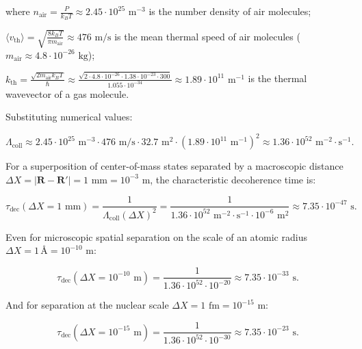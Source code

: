 where $n_{\text{air}} = \frac{P}{k_B T} \approx 2.45 \cdot 10^{25}\text{ m}^{-3}$ is the number density of air molecules;  

$\langle v_{\text{th}} \rangle = \sqrt{\frac{8 k_B T}{\pi m_{\text{air}}}} \approx 476\text{ m/s}$ is the mean thermal speed of air molecules ($m_{\text{air}} \approx 4.8 \cdot 10^{-26}\text{ kg}$);  

$k_{\text{th}} = \frac{\sqrt{2 m_{\text{air}} k_B T}}{\hbar} \approx \frac{\sqrt{2 \cdot 4.8 \cdot 10^{-26} \cdot 1.38 \cdot 10^{-23} \cdot 300}}{1.055 \cdot 10^{-34}} \approx 1.89 \cdot 10^{11}\text{ m}^{-1}$ is the thermal wavevector of a gas molecule.

Substituting numerical values:

\begin{equation}\label{eq:5.10}\tag{5.10}
\Lambda_{\text{coll}} \approx 2.45 \cdot 10^{25}\text{ m}^{-3} \cdot 476\text{ m/s} \cdot 32.7\text{ m}^2 \cdot (1.89 \cdot 10^{11}\text{ m}^{-1})^2 \approx 1.36 \cdot 10^{52}\text{ m}^{-2}\cdot\text{s}^{-1}.
\end{equation}

For a superposition of center-of-mass states separated by a macroscopic distance $\Delta X = |\mathbf{R} - \mathbf{R}'| = 1\text{ mm} = 10^{-3}\text{ m}$, the characteristic decoherence time is:

\begin{equation}\label{eq:5.11}\tag{5.11}
\tau_{\text{dec}}(\Delta X = 1\text{ mm}) = \frac{1}{\Lambda_{\text{coll}} (\Delta X)^2} = \frac{1}{1.36 \cdot 10^{52}\text{ m}^{-2}\cdot\text{s}^{-1} \cdot 10^{-6}\text{ m}^2} \approx 7.35 \cdot 10^{-47}\text{ s}.
\end{equation}

Even for microscopic spatial separation on the scale of an atomic radius $\Delta X = 1\,\text{\AA} = 10^{-10}\text{ m}$:

\begin{equation}\label{eq:5.12}\tag{5.12}
\tau_{\text{dec}}(\Delta X = 10^{-10}\text{ m}) = \frac{1}{1.36 \cdot 10^{52} \cdot 10^{-20}} \approx 7.35 \cdot 10^{-33}\text{ s}.
\end{equation}

And for separation at the nuclear scale $\Delta X = 1\text{ fm} = 10^{-15}\text{ m}$:

\begin{equation}\label{eq:5.13}\tag{5.13}
\tau_{\text{dec}}(\Delta X = 10^{-15}\text{ m}) = \frac{1}{1.36 \cdot 10^{52} \cdot 10^{-30}} \approx 7.35 \cdot 10^{-23}\text{ s}.
\end{equation}

